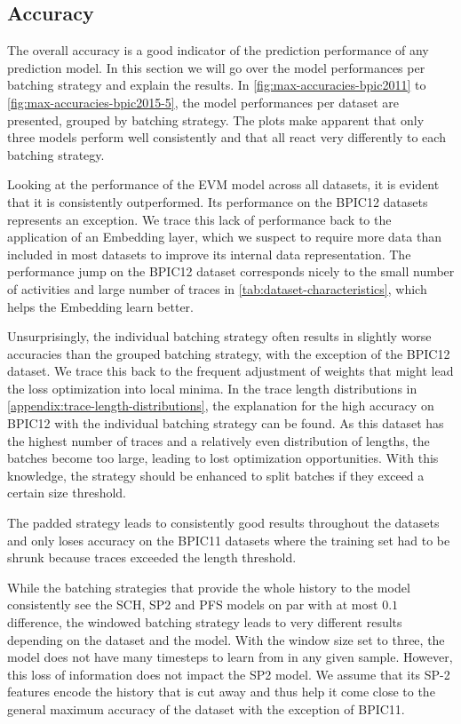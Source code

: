\subsection*{Accuracy}
The overall accuracy is a good indicator of the prediction performance of any prediction model. In this section we will go over the model performances per batching strategy and explain the results. In \autoref{fig:max-accuracies-bpic2011} to \autoref{fig:max-accuracies-bpic2015-5}, the model performances per dataset are presented, grouped by batching strategy. The plots make apparent that only three models perform well consistently and that all react very differently to each batching strategy.

Looking at the performance of the EVM model across all datasets, it is evident that it is consistently outperformed. Its performance on the BPIC12 datasets represents an exception. We trace this lack of performance back to the application of an Embedding layer, which we suspect to require more data than included in most datasets to improve its internal data representation. The performance jump on the BPIC12 dataset corresponds nicely to the small number of activities and large number of traces in \autoref{tab:dataset-characteristics}, which helps the Embedding learn better.

Unsurprisingly, the individual batching strategy often results in slightly worse accuracies than the grouped batching strategy, with the exception of the BPIC12 dataset. We trace this back to the frequent adjustment of weights that might lead the loss optimization into local minima. In the trace length distributions in \autoref{appendix:trace-length-distributions}, the explanation for the high accuracy on BPIC12 with the individual batching strategy can be found. As this dataset has the highest number of traces and a relatively even distribution of lengths, the batches become too large, leading to lost optimization opportunities. With this knowledge, the strategy should be enhanced to split batches if they exceed a certain size threshold.

The padded strategy leads to consistently good results throughout the datasets and only loses accuracy on the BPIC11 datasets where the training set had to be shrunk because traces exceeded the length threshold.

While the batching strategies that provide the whole history to the model consistently see the SCH, SP2 and PFS models on par with at most $0.1$ difference, the windowed batching strategy leads to very different results depending on the dataset and the model. With the window size set to three, the model does not have many timesteps to learn from in any given sample. However, this loss of information does not impact the SP2 model. We assume that its SP-2 features encode the history that is cut away and thus help it come close to the general maximum accuracy of the dataset with the exception of BPIC11.

